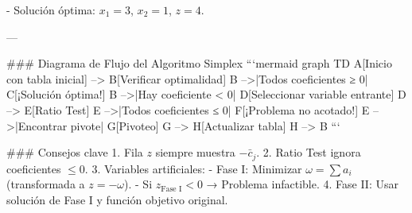 - Solución óptima: \(x_1 = 3\), \(x_2 = 1\), \(z = 4\).

---

### Diagrama de Flujo del Algoritmo Simplex
```mermaid
graph TD
    A[Inicio con tabla inicial] --> B[Verificar optimalidad]
    B -->|Todos coeficientes ≥ 0| C[¡Solución óptima!]
    B -->|Hay coeficiente < 0| D[Seleccionar variable entrante]
    D --> E[Ratio Test]
    E -->|Todos coeficientes ≤ 0| F[¡Problema no acotado!]
    E -->|Encontrar pivote| G[Pivoteo]
    G --> H[Actualizar tabla]
    H --> B
```

### Consejos clave
1. Fila \(z\) siempre muestra \(-\bar{c}_j\).
2. Ratio Test ignora coeficientes \(\leq 0\).
3. Variables artificiales:
   - Fase I: Minimizar \(\omega = \sum a_i\) (transformada a \(z = -\omega\)).
   - Si \(z_{\text{Fase I}} < 0\) → Problema infactible.
4. Fase II: Usar solución de Fase I y función objetivo original.